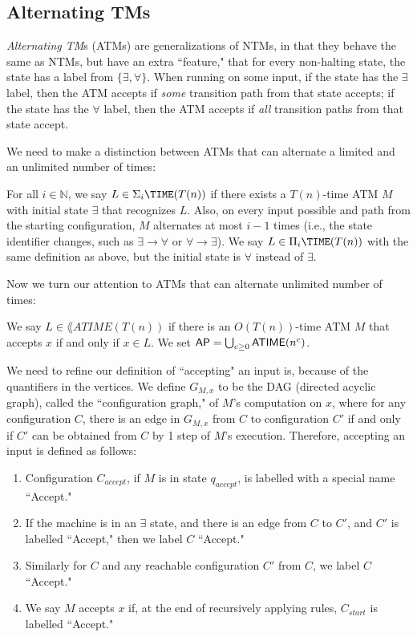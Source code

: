 \subsection{Alternating TMs}
\begin{definition}
\emph{Alternating TM}s (ATMs) are generalizations of NTMs, in that they behave the same as NTMs, but have an extra ``feature," that for every non-halting state, the state has a label from $\{\exists, \forall\}$. When running on some input, if the state has the $\exists$ label, then the ATM accepts if \emph{some} transition path from that state accepts; if the state has the $\forall$ label, then the ATM accepts if \emph{all} transition paths from that state accept.
\end{definition}

We need to make a distinction between ATMs that can alternate a limited and an unlimited number of times:

\begin{definition}
For all $i \in \mathbb{N}$, we say $L \in \Sigma_i\TIME(T(n))$ if there exists a $T(n)$-time ATM $M$ with initial state $\exists$ that recognizes $L$. Also, on every input possible and path from the starting configuration, $M$ alternates at most $i-1$ times (i.e., the state identifier changes, such as $\exists \rightarrow \forall$ or $\forall \rightarrow \exists$). We say $L \in \Pi_i\TIME(T(n))$ with the same definition as above, but the initial state is $\forall$ instead of $\exists$.
\end{definition}

Now we turn our attention to ATMs that can alternate unlimited number of times:

\newcommand{\ATIME}{\lang{ATIME}}
\newcommand{\TQBF}{\lang{TQBF}}
\begin{definition}
We say $L \in \ATIME(T(n))$ if there is an $O(T(n))$-time ATM $M$ that accepts $x$ if and only if $x \in L$. We set $\AP = \bigcup_{c \ge 0}\ATIME(n^c)$.
\end{definition}

We need to refine our definition of ``accepting" an input is, because of the quantifiers in the vertices. We define $G_{M, x}$ to be the DAG (directed acyclic graph), called the ``configuration graph," of $M$'s computation on $x$, where for any configuration $C$, there is an edge in $G_{M, x}$ from $C$ to configuration $C'$ if and only if $C'$ can be obtained from $C$ by 1 step of $M$'s execution. Therefore, accepting an input is defined as follows:
\begin{enumerate}
\item Configuration $C_{accept}$, if $M$ is in state $q_{accept}$, is labelled with a special name ``Accept."
\item If the machine is in an $\exists$ state, and there is an edge from $C$ to $C'$, and $C'$ is labelled ``Accept," then we label $C$ ``Accept."
\item Similarly for $C$ and any reachable configuration $C'$ from $C$, we label $C$ ``Accept."
\item We say $M$ accepts $x$ if, at the end of recursively applying rules, $C_{start}$ is labelled ``Accept."
\end{enumerate}


